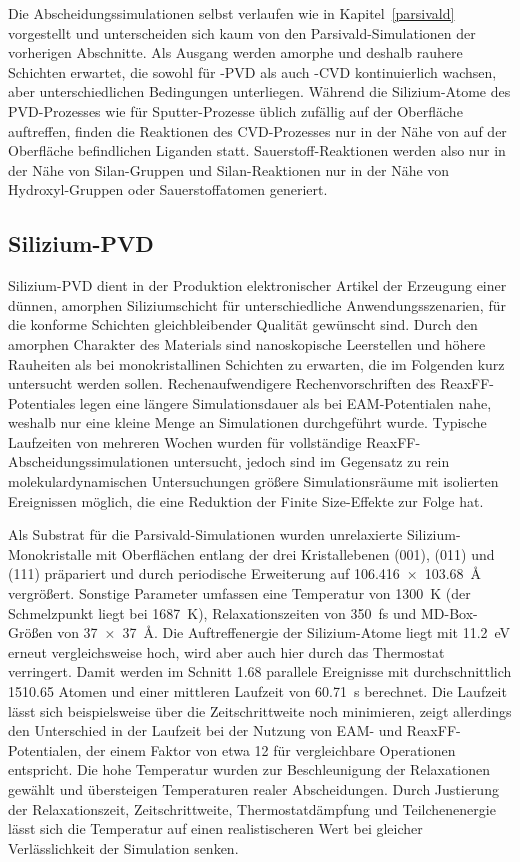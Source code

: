Die Abscheidungssimulationen selbst verlaufen wie in Kapitel~\ref{parsivald} vorgestellt und unterscheiden sich kaum von den Parsivald-Simulationen der vorherigen Abschnitte.
Als Ausgang werden amorphe und deshalb rauhere Schichten erwartet, die sowohl für -PVD als auch -CVD kontinuierlich wachsen, aber unterschiedlichen Bedingungen unterliegen.
Während die Silizium-Atome des PVD-Prozesses wie für Sputter-Prozesse üblich zufällig auf der Oberfläche auftreffen, finden die Reaktionen des CVD-Prozesses nur in der Nähe von auf der Oberfläche befindlichen Liganden statt.
Sauerstoff-Reaktionen werden also nur in der Nähe von Silan-Gruppen und Silan-Reaktionen nur in der Nähe von Hydroxyl-Gruppen oder Sauerstoffatomen generiert.

\subsection{Silizium-PVD}

Silizium-PVD dient in der Produktion elektronischer Artikel der Erzeugung einer dünnen, amorphen Siliziumschicht für unterschiedliche Anwendungsszenarien, für die konforme Schichten gleichbleibender Qualität gewünscht sind.
Durch den amorphen Charakter des Materials sind nanoskopische Leerstellen und höhere Rauheiten als bei monokristallinen Schichten zu erwarten, die im Folgenden kurz untersucht werden sollen.
Rechenaufwendigere Rechenvorschriften des ReaxFF-Potentiales legen eine längere Simulationsdauer als bei EAM-Potentialen nahe, weshalb nur eine kleine Menge an Simulationen durchgeführt wurde.
Typische Laufzeiten von mehreren Wochen wurden für vollständige ReaxFF-Abscheidungssimulationen untersucht, jedoch sind im Gegensatz zu rein molekulardynamischen Untersuchungen größere Simulationsräume mit isolierten Ereignissen möglich, die eine Reduktion der Finite Size-Effekte zur Folge hat.

Als Substrat für die Parsivald-Simulationen wurden unrelaxierte Silizium-Monokristalle mit Oberflächen entlang der drei Kristallebenen (001), (011) und (111) präpariert und durch periodische Erweiterung auf \SI{106.416x103.68}{\angstrom} vergrößert.
Sonstige Parameter umfassen eine Temperatur von \SI{1300}{\kelvin} (der Schmelzpunkt liegt bei \SI{1687}{\kelvin}), Relaxationszeiten von \SI{350}{\femto\second} und MD-Box-Größen von \SI{37x37}{\angstrom}.
Die Auftreffenergie der Silizium-Atome liegt mit \SI{11.2}{\electronvolt} erneut vergleichsweise hoch, wird aber auch hier durch das Thermostat verringert.
Damit werden im Schnitt \num{1.68} parallele Ereignisse mit durchschnittlich \num{1510.65} Atomen und einer mittleren Laufzeit von \SI{60.71}{\second} berechnet.
Die Laufzeit lässt sich beispielsweise über die Zeitschrittweite noch minimieren, zeigt allerdings den Unterschied in der Laufzeit bei der Nutzung von EAM- und ReaxFF-Potentialen, der einem Faktor von etwa \num{12} für vergleichbare Operationen entspricht.
Die hohe Temperatur wurden zur Beschleunigung der Relaxationen gewählt und übersteigen Temperaturen realer Abscheidungen.
Durch Justierung der Relaxationszeit, Zeitschrittweite, Thermostatdämpfung und Teilchenenergie lässt sich die Temperatur auf einen realistischeren Wert bei gleicher Verlässlichkeit der Simulation senken.

